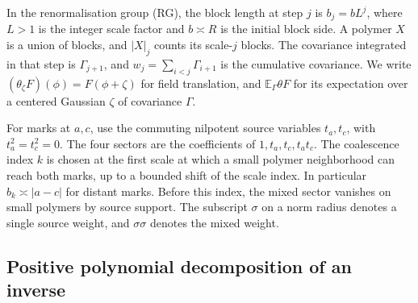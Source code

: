 \documentclass[11pt]{article}
\newcommand{\E}{\mathbb E}
\begin{document}
In the renormalisation group (RG), the block length at step \(j\)
is \(b_j=bL^j\), where \(L>1\) is the integer scale factor and
\(b\asymp R\) is the initial block side. A polymer \(X\) is a
union of blocks, and \(|X|_j\) counts its scale-\(j\) blocks.
The covariance integrated in that step is \(\Gamma_{j+1}\),
and \(w_j=\sum_{i<j}\Gamma_{i+1}\) is the cumulative covariance.
We write \((\theta_\zeta F)(\phi)=F(\phi+\zeta)\) for field
translation, and \(\E_\Gamma\theta F\) for its expectation over
a centered Gaussian \(\zeta\) of covariance \(\Gamma\).

For marks at \(a,c\), use the commuting nilpotent source variables
\(t_a,t_c\), with \(t_a^2=t_c^2=0\). The four sectors are
the coefficients of \(1,t_a,t_c,t_at_c\).
The coalescence index \(k\) is chosen at the first scale at which
a small polymer neighborhood can reach both marks, up to a bounded
shift of the scale index. In particular \(b_k\asymp|a-c|\) for
distant marks. Before this index, the mixed sector vanishes on small
polymers by source support. The subscript \(\sigma\) on a norm radius
denotes a single source weight, and \(\sigma\sigma\) denotes the
mixed weight.

\subsection{Positive polynomial decomposition of an inverse}
\end{document}
